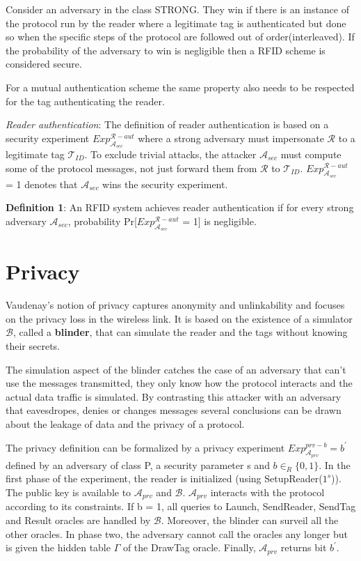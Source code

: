     Consider an adversary in the class STRONG. They win if there is an instance of the protocol run
    by the reader where a legitimate tag is authenticated but done so when the specific steps of the 
    protocol are followed out of order(interleaved). If the probability of the adversary to win is 
    negligible then a RFID scheme is considered secure.

    For a mutual authentication scheme the same property also needs to be respected for the tag authenticating
    the reader.

    \textit{Reader authentication}: The definition of reader authentication is based on a security experiment $Exp_{\mathcal{A}_{sec}}^{\mathcal{R}-aut}$
    where a strong adversary must impersonate $\mathcal{R}$ to a legitimate tag $\mathcal{T}_{ID}$. To exclude trivial attacks, the attacker $\mathcal{A}_{sec}$
    must compute some of the protocol messages, not just forward them from $\mathcal{R}$ to $\mathcal{T}_{ID}$. $Exp_{\mathcal{A}_{sec}}^{\mathcal{R}-aut}$ = 1
    denotes that $\mathcal{A}_{sec}$ wins the security experiment.

    \textbf{Definition 1}: An RFID system achieves reader authentication if for every strong adversary $\mathcal{A}_{sec}$, probability 
    Pr[$Exp_{\mathcal{A}_{sec}}^{\mathcal{R}-aut}$ = 1] is negligible.

    \section{Privacy}

    Vaudenay's notion of privacy captures anonymity and unlinkability and focuses on the privacy loss in the wireless link. It is based on 
    the existence of a simulator $\mathcal{B}$, called a \textbf{blinder}, that can simulate the reader and the tags without knowing their secrets.
    
    The simulation aspect of the blinder catches the case of an adversary that can't use the messages transmitted, they only know how the protocol
    interacts and the actual data traffic is simulated. By contrasting this attacker with an adversary that eavesdropes, denies or changes messages
    several conclusions can be drawn about the leakage of data and the privacy of a protocol.

    The privacy definition can be formalized by a privacy experiment $Exp_{\mathcal{A}_{prv}}^{prv-b} = b^{'}$ defined by an adversary of class P, a
    security parameter s and $b \in_{R} \{0,1\}$. In the first phase of the experiment, the reader is initialized (using SetupReader($1^s$)). 
    The public key is available to $\mathcal{A}_{prv}$ and $\mathcal{B}$. $\mathcal{A}_{prv}$ interacts with the protocol according to its constraints.
    If b = 1, all queries to Launch, SendReader, SendTag and Result oracles are handled by $\mathcal{B}$. Moreover, the blinder can surveil all the other
    oracles. In phase two, the adversary cannot call the oracles any longer but is given the hidden table $\Gamma$ of the DrawTag oracle. Finally, 
    $\mathcal{A}_{prv}$ returns bit $b^{'}$.

